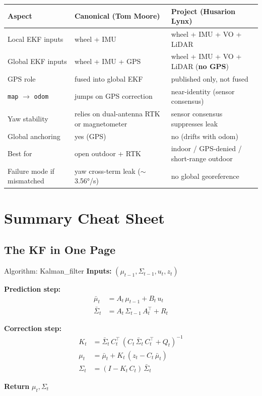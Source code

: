 \documentclass[11pt,a4paper]{article}
\begin{document}
\begin{center}
\footnotesize
\begin{tabular}{p{4.5cm} p{4.5cm} p{4.5cm}}
\toprule
\textbf{Aspect} & \textbf{Canonical (Tom Moore)} & \textbf{Project (Husarion Lynx)} \\
\midrule
Local EKF inputs & wheel + IMU & wheel + IMU + VO + LiDAR \\
Global EKF inputs & wheel + IMU + GPS & wheel + IMU + VO + LiDAR (\textbf{no GPS}) \\
GPS role & fused into global EKF & published only, not fused \\
\texttt{map} $\to$ \texttt{odom} & jumps on GPS correction & near-identity (sensor consensus) \\
Yaw stability & relies on dual-antenna RTK or magnetometer & sensor consensus suppresses leak \\
Global anchoring & yes (GPS) & no (drifts with odom) \\
Best for & open outdoor + RTK & indoor / GPS-denied / short-range outdoor \\
Failure mode if mismatched & yaw cross-term leak ($\sim$3.56°/s) & no global georeference \\
\bottomrule
\end{tabular}
\end{center}

\section{Summary Cheat Sheet}

\subsection{The KF in One Page}

\begin{algobox}{Algorithm: Kalman\_filter}
\textbf{Inputs:} $(\mu_{t-1}, \Sigma_{t-1}, u_t, z_t)$


\textbf{Prediction step:}
\begin{align*}
\bar{\mu}_t &= A_t\, \mu_{t-1} + B_t\, u_t \\
\bar{\Sigma}_t &= A_t\, \Sigma_{t-1}\, A_t^\top + R_t
\end{align*}

\textbf{Correction step:}
\begin{align*}
K_t &= \bar{\Sigma}_t\, C_t^\top\,(C_t\, \bar{\Sigma}_t\, C_t^\top + Q_t)^{-1} \\
\mu_t &= \bar{\mu}_t + K_t\,(z_t - C_t\, \bar{\mu}_t) \\
\Sigma_t &= (I - K_t\, C_t)\,\bar{\Sigma}_t
\end{align*}

\textbf{Return} $\mu_t, \Sigma_t$
\end{algobox}
\end{document}
